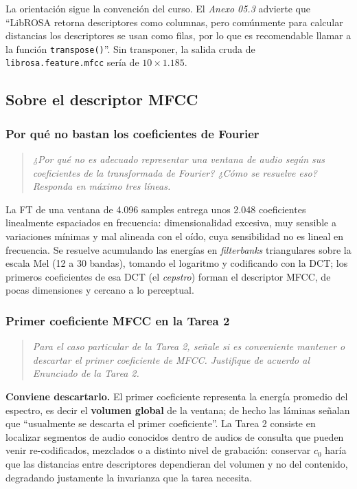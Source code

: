 \documentclass[11pt, a4paper]{article}
\newcommand{\code}[1]{\texttt{#1}}
\newenvironment{enunciado}
  {\begin{quote}\itshape\color{black!75}\small}
  {\end{quote}}
\begin{document}
La orientación sigue la convención del curso. El \textit{Anexo 05.3} advierte que ``LibROSA retorna
descriptores como columnas, pero comúnmente para calcular distancias los descriptores se usan como
filas, por lo que es recomendable llamar a la función \code{transpose()}''. Sin transponer, la salida
cruda de \code{librosa.feature.mfcc} sería de $10 \times 1.185$.

\subsection{Sobre el descriptor MFCC}

\subsubsection{Por qué no bastan los coeficientes de Fourier}

\begin{enunciado}
¿Por qué no es adecuado representar una ventana de audio según sus coeficientes de la transformada
de Fourier? ¿Cómo se resuelve eso? Responda en máximo tres líneas.
\end{enunciado}

La FT de una ventana de 4.096 samples entrega unos 2.048 coeficientes linealmente espaciados en
frecuencia: dimensionalidad excesiva, muy sensible a variaciones mínimas y mal alineada con el oído,
cuya sensibilidad no es lineal en frecuencia. Se resuelve acumulando las energías en
\textit{filterbanks} triangulares sobre la escala Mel (12 a 30 bandas), tomando el logaritmo y
codificando con la DCT; los primeros coeficientes de esa DCT (el \textit{cepstro}) forman el
descriptor MFCC, de pocas dimensiones y cercano a lo perceptual.

\subsubsection{Primer coeficiente MFCC en la Tarea 2}

\begin{enunciado}
Para el caso particular de la Tarea 2, señale si es conveniente mantener o descartar el primer
coeficiente de MFCC. Justifique de acuerdo al Enunciado de la Tarea 2.
\end{enunciado}

\textbf{Conviene descartarlo.} El primer coeficiente representa la energía promedio del espectro, es
decir el \textbf{volumen global} de la ventana; de hecho las láminas señalan que ``usualmente se
descarta el primer coeficiente''. La Tarea 2 consiste en localizar segmentos de audio conocidos
dentro de audios de consulta que pueden venir re-codificados, mezclados o a distinto nivel de
grabación: conservar $c_0$ haría que las distancias entre descriptores dependieran del volumen y no
del contenido, degradando justamente la invarianza que la tarea necesita.
\end{document}
